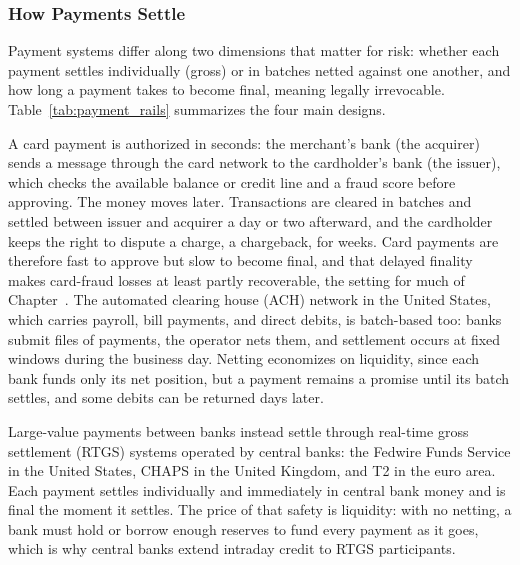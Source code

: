 \documentclass[../ai_in_finance]{subfiles}
\begin{document}
\subsubsection*{How Payments Settle}

Payment systems differ along two dimensions that matter for risk: whether each payment settles individually (gross) or in batches netted against one another, and how long a payment takes to become final, meaning legally irrevocable. Table~\ref{tab:payment_rails} summarizes the four main designs.

A card payment is authorized in seconds: the merchant's bank (the acquirer) sends a message through the card network to the cardholder's bank (the issuer), which checks the available balance or credit line and a fraud score before approving. The money moves later. Transactions are cleared in batches and settled between issuer and acquirer a day or two afterward, and the cardholder keeps the right to dispute a charge, a chargeback, for weeks. Card payments are therefore fast to approve but slow to become final, and that delayed finality makes card-fraud losses at least partly recoverable, the setting for much of Chapter~. The automated clearing house (ACH) network in the United States, which carries payroll, bill payments, and direct debits, is batch-based too: banks submit files of payments, the operator nets them, and settlement occurs at fixed windows during the business day. Netting economizes on liquidity, since each bank funds only its net position, but a payment remains a promise until its batch settles, and some debits can be returned days later.

Large-value payments between banks instead settle through real-time gross settlement (RTGS) systems operated by central banks: the Fedwire Funds Service in the United States, CHAPS in the United Kingdom, and T2 in the euro area. Each payment settles individually and immediately in central bank money and is final the moment it settles. The price of that safety is liquidity: with no netting, a bank must hold or borrow enough reserves to fund every payment as it goes, which is why central banks extend intraday credit to RTGS participants.
\end{document}
